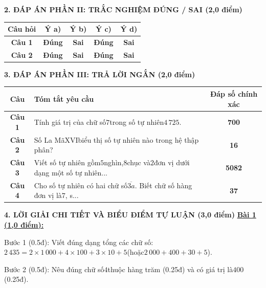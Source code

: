\documentclass[11pt,a4paper]{article}
\begin{document}
\noindent\textbf{\large 2. ĐÁP ÁN PHẦN II: TRẮC NGHIỆM ĐÚNG / SAI (2,0 điểm)}
\vspace{4pt}
\begin{center}
\begin{tabular}{|c|c|c|c|c|}
\hline
\textbf{Câu hỏi} & \textbf{Ý a)} & \textbf{Ý b)} & \textbf{Ý c)} & \textbf{Ý d)} \\
\hline
\textbf{Câu 1} & \textbf{Đúng} & \textbf{Sai} & \textbf{Đúng} & \textbf{Sai} \\
\hline
\textbf{Câu 2} & \textbf{Đúng} & \textbf{Sai} & \textbf{Đúng} & \textbf{Sai} \\
\hline
\end{tabular}
\end{center}
\vspace{6pt}


\noindent\textbf{\large 3. ĐÁP ÁN PHẦN III: TRẢ LỜI NGẮN (2,0 điểm)}
\vspace{4pt}
\begin{center}
\begin{tabular}{|c|m{11cm}|c|}
\hline
\textbf{Câu} & \textbf{Tóm tắt yêu cầu} & \textbf{Đáp số chính xác} \\
\hline
\textbf{Câu 1} & Tính giá trị của chữ số$7$trong số tự nhiên$4\,725$. & \textbf{700} \\
\hline
\textbf{Câu 2} & Số La Mã$\mathrm{XVI}$biểu thị số tự nhiên nào trong hệ thập phân? & \textbf{16} \\
\hline
\textbf{Câu 3} & Viết số tự nhiên gồm$5$nghìn,$8$chục và$2$đơn vị dưới dạng một số tự nhiên... & \textbf{5082} \\
\hline
\textbf{Câu 4} & Cho số tự nhiên có hai chữ số$\overline{3a}$. Biết chữ số hàng đơn vị là$7$, s... & \textbf{37} \\
\hline
\end{tabular}
\end{center}
\vspace{6pt}


\noindent\textbf{\large 4. LỜI GIẢI CHI TIẾT VÀ BIỂU ĐIỂM TỰ LUẬN (3,0 điểm)}
\vspace{4pt}
\noindent\textbf{\underline{Bài 1 (1,0 điểm):}}\par\vspace{3pt}
Bước 1 (0.5đ): Viết đúng dạng tổng các chữ số:$2\,435 = 2 \times 1\,000 + 4 \times 100 + 3 \times 10 + 5$(hoặc$2\,000 + 400 + 30 + 5$).\par\noindent Bước 2 (0.5đ): Nêu đúng chữ số$4$thuộc hàng trăm (0.25đ) và có giá trị là$400$(0.25đ).\par\vspace{8pt}
\end{document}
